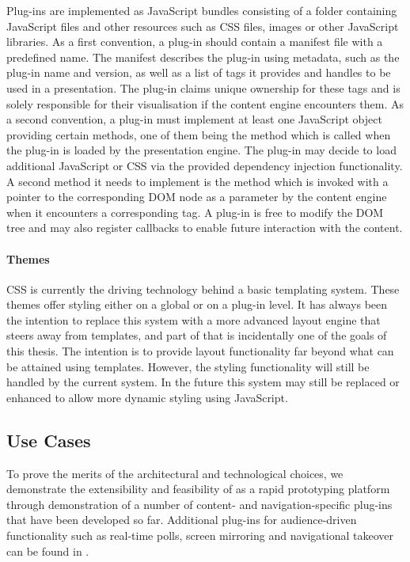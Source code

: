       Plug-ins are implemented as JavaScript bundles consisting of a folder
      containing JavaScript files and other resources such as CSS files, images
      or other JavaScript libraries. As a first convention, a plug-in should
      contain a manifest file with a predefined name. The manifest describes
      the plug-in using metadata, such as the plug-in name and version, as well
      as a list of tags it provides and handles to be used in a presentation.
      The plug-in claims unique ownership for these tags and is solely
      responsible for their visualisation if the content engine encounters
      them. As a second convention, a plug-in must implement at least one
      JavaScript object providing certain methods, one of them being the
       method which is called when the plug-in is loaded by the
      presentation engine. The plug-in may decide to load additional JavaScript
      or CSS via the provided dependency injection functionality. A second
      method it needs to implement is the  method which is
      invoked with a pointer to the corresponding DOM node as a parameter by
      the content engine when it encounters a corresponding tag. A plug-in is
      free to modify the DOM tree and may also register callbacks to enable
      future interaction with the content.

     \paragraph{Themes}
     
      CSS is currently the driving technology behind a basic templating system.
      These themes offer styling either on a global or on a plug-in level. It
      has always been the intention to replace this system with a more advanced
      layout engine that steers away from templates, and part of that is
      incidentally one of the goals of this thesis. The intention is to provide
      layout functionality far beyond what can be attained using templates.
      However, the styling functionality will still be handled by the current
      system. In the future this system may still be replaced or enhanced to
      allow more dynamic styling using JavaScript.

   \subsection{Use Cases}

    To prove the merits of the architectural and technological choices, we
    demonstrate the extensibility and feasibility of \mxp as a rapid
    prototyping platform through demonstration of a number of content- and
    navigation-specific plug-ins that have been developed so far. Additional
    plug-ins for audience-driven functionality such as real-time polls, screen
    mirroring and navigational takeover can be found in \citep{roels-2}.

